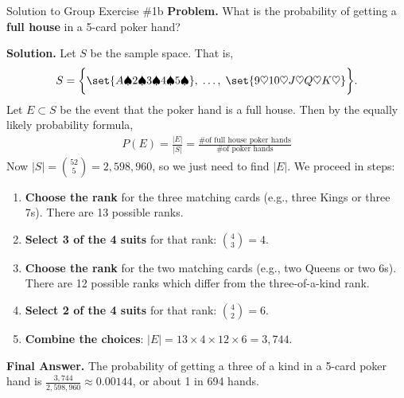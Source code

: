 \documentclass[10pt]{beamer}
\begin{document}
\begin{frame}{Solution to Group Exercise \#1b}
\footnotesize 
 \colorbox{blue!30}{\textbf{Problem.}} What is the probability of getting a \textbf{full house} in a 5-card poker hand? 
\vfill 

 \colorbox{green!30}{\textbf{Solution.}} Let $S$ be the sample space.  That is, 
\[S=\bigg\{ \set{A\spadesuit 2 \spadesuit 3 \spadesuit 4 \spadesuit 5 \spadesuit}, \;   \hdots, \; \set{9 \heartsuit 10 \heartsuit J \heartsuit Q \heartsuit K \heartsuit} \bigg\}. \]
Let $E \subset S$ be the event that the poker hand is a full house. Then by the equally likely probability formula, 
\begin{align*}
P(E) = 	\frac{|E|}{|S|} = \frac{\text{\# of full house poker hands}}{\text{\# of poker hands}}
\end{align*}
Now $|S|=\binom{52}{5} =  2,598,960$, so we just need to find $|E|$.   We proceed in steps:

\begin{enumerate} \footnotesize 
\item \textbf{Choose the rank} for the three matching cards 	(e.g., three Kings or three 7s).  There are 13 possible ranks.
\item \textbf{Select 3 of the 4 suits} for that rank:  $\binom{4}{3}=4$.
\item \textbf{Choose the rank} for the two matching cards 	(e.g., two Queens or two 6s).  There are 12 possible ranks which differ from the three-of-a-kind rank.
\item \textbf{Select 2 of the 4 suits} for that rank:  $\binom{4}{2}=6$.
\item \textbf{Combine the choices}:  $|E|=13 \times 4 \times 12 \times 6 = 3,744$.
\end{enumerate}

\alert{\textbf{Final Answer.}} The probability of getting a three of a kind in a 5-card poker hand is $\frac{3,744}{2,598,960} \approx 0.00144$, or about 1 in 694 hands.
\end{frame}
\end{document}
